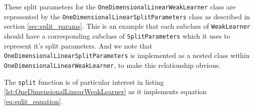 \documentclass[12pt,twoside,notitlepage]{report}
\begin{document}
                These split parameters for the \texttt{OneDimensionalLinearWeakLearner} class are represented by the 
                \texttt{OneDimensionalLinearSplitParameters} class as described in section \ref{sec:split_params}. This 
                is an example that each subclass of \texttt{WeakLearner} should have a corresponding subclass of 
                \texttt{SplitParameters} which it uses to represent it's split parameters. And we note that 
                \texttt{OneDimensionalLinearSplitParameters} is implemented as a nested class within 
                \texttt{OneDimensionalLinearWeakLearner}, to make this relationship obvious.


                The \texttt{split} function is of particular interest in listing \ref{lst:OneDimensionalLinearWeakLearner} as 
                it implements equation \ref{eq:split_equation}. 
\end{document}
